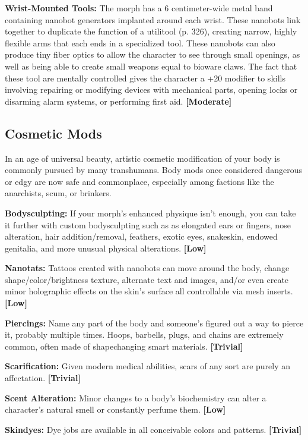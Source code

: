 \textbf{Wrist-Mounted Tools: }The morph has a 6 centimeter-wide
metal band containing nanobot generators
implanted around each wrist. These nanobots link together
to duplicate the function of a utilitool (p. 326),
creating narrow, highly flexible arms that each ends in 
a specialized tool. These nanobots can also produce 
tiny fiber optics to allow the character to see through 
small openings, as well as being able to create small 
weapons equal to bioware claws. The fact that these 
tool are mentally controlled gives the character a +20 
modifier to skills involving repairing or modifying devices
with mechanical parts, opening locks or disarming
alarm systems, or performing first aid. \textbf{[Moderate]}

\subsection{Cosmetic Mods}

In an age of universal beauty, artistic cosmetic modification
of your body is commonly pursued by many
transhumans. Body mods once considered dangerous 
or edgy are now safe and commonplace, especially 
among factions like the anarchists, scum, or brinkers.

\textbf{Bodysculpting:} If your morph's enhanced physique 
isn't enough, you can take it further with custom 
bodysculpting such as as elongated ears or fingers, 
nose alteration, hair addition/removal, feathers, exotic 
eyes, snakeskin, endowed genitalia, and more unusual 
physical alterations. \textbf{[Low]}

\textbf{Nanotats:} Tattoos created with nanobots can 
move around the body, change shape/color/brightness
texture, alternate text and images, and/or even
create minor holographic effects on the skin's surface
all controllable via mesh inserts. \textbf{[Low]}

\textbf{Piercings:} Name any part of the body and someone's
figured out a way to pierce it, probably multiple
times. Hoops, barbells, plugs, and chains are
extremely common, often made of shapechanging 
smart materials. \textbf{[Trivial]}

\textbf{Scarification:} Given modern medical abilities, scars 
of any sort are purely an affectation. \textbf{[Trivial]}

\textbf{Scent Alteration:} Minor changes to a body's biochemistry
can alter a character's natural smell or
constantly perfume them. \textbf{[Low]}

\textbf{Skindyes:} Dye jobs are available in all conceivable 
colors and patterns. \textbf{[Trivial]}

